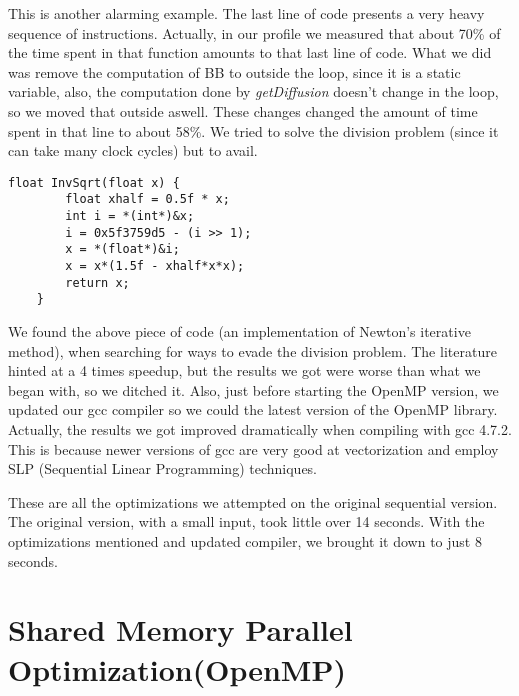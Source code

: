 \documentclass[a4paper,10pt,openright,openbib,twocolumn]{article}
\begin{document}
This is another alarming example. The last line of code presents a very heavy sequence of instructions. Actually, in our profile we measured that about 70\% of the time spent in that function amounts to that last line of code. What we did was remove the computation of BB to outside the loop, since it is a static variable, also, the computation done by \emph{getDiffusion} doesn't change in the loop, so we moved that outside aswell. These changes changed the amount of time spent in that line to about 58\%. 
We tried to solve the division problem (since it can take many clock cycles) but to avail.

\begin{minipage}{.45\textwidth}
\lstset{
    language=C++,
    basicstyle=\ttfamily\small,
    breaklines=true
}
\begin{lstlisting}[caption=Fast Square-Root]    
    float InvSqrt(float x) {
        float xhalf = 0.5f * x;
        int i = *(int*)&x;
        i = 0x5f3759d5 - (i >> 1);
        x = *(float*)&i;
        x = x*(1.5f - xhalf*x*x);
        return x;
    }
\end{lstlisting}
\end{minipage} 

We found the above piece of code (an implementation of Newton's iterative method), when searching for ways to evade the division problem. The literature hinted at a 4 times speedup, but the results we got were worse than what we began with, so we ditched it.  
Also, just before starting the OpenMP version, we updated our gcc compiler so we could the latest version of the OpenMP library. Actually, the results we got improved dramatically when compiling with gcc 4.7.2. This is because newer versions of gcc are very good at vectorization and employ SLP (Sequential Linear Programming) techniques.

These are all the optimizations we attempted on the original sequential version. The original version, with a small input, took little over 14 seconds. With the optimizations mentioned and updated compiler, we brought it down to just 8 seconds. 


\section{Shared Memory Parallel Optimization(OpenMP)}
\end{document}
